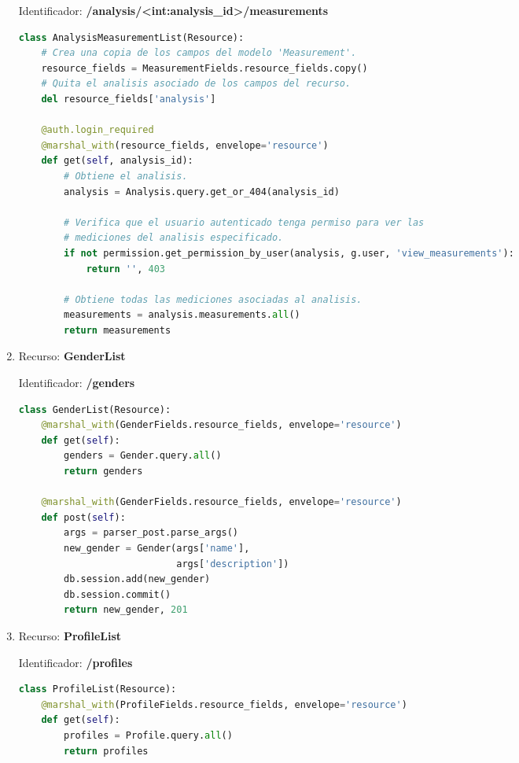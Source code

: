 \begin{enumerate}
Identificador:
\textbf{/analysis/<int:analysis\_id>/measurements}

\begin{lstlisting}[language=Python]
class AnalysisMeasurementList(Resource):
    # Crea una copia de los campos del modelo 'Measurement'.
    resource_fields = MeasurementFields.resource_fields.copy()
    # Quita el analisis asociado de los campos del recurso.
    del resource_fields['analysis']
    
    @auth.login_required
    @marshal_with(resource_fields, envelope='resource')
    def get(self, analysis_id):
        # Obtiene el analisis.
        analysis = Analysis.query.get_or_404(analysis_id)

        # Verifica que el usuario autenticado tenga permiso para ver las
        # mediciones del analisis especificado.
        if not permission.get_permission_by_user(analysis, g.user, 'view_measurements'):
            return '', 403

        # Obtiene todas las mediciones asociadas al analisis.
        measurements = analysis.measurements.all()
        return measurements
\end{lstlisting}

\item Recurso: \textbf{GenderList}

Identificador: \textbf{/genders}

\begin{lstlisting}[language=Python]
class GenderList(Resource):
    @marshal_with(GenderFields.resource_fields, envelope='resource')
    def get(self):
        genders = Gender.query.all()
        return genders

    @marshal_with(GenderFields.resource_fields, envelope='resource')
    def post(self):
        args = parser_post.parse_args()
        new_gender = Gender(args['name'],
                            args['description'])
        db.session.add(new_gender)
        db.session.commit()
        return new_gender, 201
\end{lstlisting}

\item Recurso: \textbf{ProfileList}

Identificador: \textbf{/profiles}

\begin{lstlisting}[language=Python]
class ProfileList(Resource):
    @marshal_with(ProfileFields.resource_fields, envelope='resource')
    def get(self):
        profiles = Profile.query.all()
        return profiles


\end{lstlisting}
\end{enumerate}
